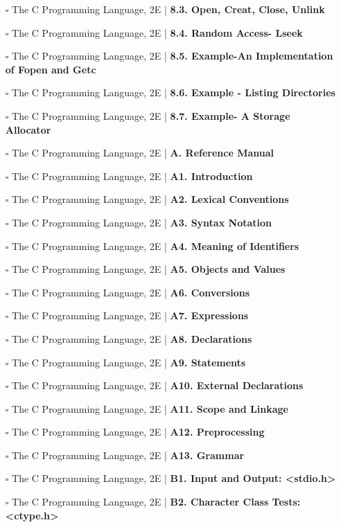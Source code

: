 \documentclass[a4, landscape, 12pt]{article}
\newcommand{\checkbox}{$\square$}%
\begin{document}
\begin{itemize}
{}
\item [\checkbox]  The C Programming Language, 2E | \textbf{ 8.3. Open, Creat, Close, Unlink
}
\item [\checkbox]  The C Programming Language, 2E | \textbf{ 8.4. Random Access- Lseek
}
\item [\checkbox]  The C Programming Language, 2E | \textbf{ 8.5. Example-An Implementation of Fopen and Getc
}
\item [\checkbox]  The C Programming Language, 2E | \textbf{ 8.6. Example - Listing Directories
}
\item [\checkbox]  The C Programming Language, 2E | \textbf{ 8.7. Example- A Storage Allocator
}
\item [\checkbox]  The C Programming Language, 2E | \textbf{ A. Reference Manual
}
\item [\checkbox]  The C Programming Language, 2E | \textbf{ A1. Introduction
}
\item [\checkbox]  The C Programming Language, 2E | \textbf{ A2. Lexical Conventions
}
\item [\checkbox]  The C Programming Language, 2E | \textbf{ A3. Syntax Notation
}
\item [\checkbox]  The C Programming Language, 2E | \textbf{ A4. Meaning of Identifiers
}
\item [\checkbox]  The C Programming Language, 2E | \textbf{ A5. Objects and Values
}
\item [\checkbox]  The C Programming Language, 2E | \textbf{ A6. Conversions
}
\item [\checkbox]  The C Programming Language, 2E | \textbf{ A7. Expressions
}
\item [\checkbox]  The C Programming Language, 2E | \textbf{ A8. Declarations
}
\item [\checkbox]  The C Programming Language, 2E | \textbf{ A9. Statements
}
\item [\checkbox]  The C Programming Language, 2E | \textbf{ A10. External Declarations
}
\item [\checkbox]  The C Programming Language, 2E | \textbf{ A11. Scope and Linkage
}
\item [\checkbox]  The C Programming Language, 2E | \textbf{ A12. Preprocessing
}
\item [\checkbox]  The C Programming Language, 2E | \textbf{ A13. Grammar
}
\item [\checkbox]  The C Programming Language, 2E | \textbf{ B1. Input and Output: <stdio.h>
}
\item [\checkbox]  The C Programming Language, 2E | \textbf{ B2. Character Class Tests: <ctype.h>
}
\end{itemize}
\end{document}
